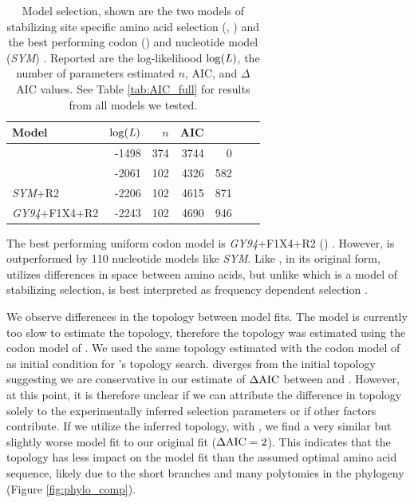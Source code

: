 \documentclass[12pt]{article}
\begin{document}
\begin{table}
  \centering
  \caption{Model selection, shown are the two models of stabilizing site specific amino acid selection (\selac, \phydms) and the best performing codon (\gy) and nucleotide model  (\emph{SYM}) \citep{GoldmanAndYang1994, zharkikh1994}. 
  Reported are the log-likelihood $\log(\text{\emph{L}})$, the number of parameters estimated $n$, AIC, and $\Delta$AIC values.
  See Table \ref{tab:AIC_full} for results from all models we tested.
}  
  \begin{tabular}{lrrrrrr}
    \hline
    Model							& $\log(\text{\emph{L}})$ & $n$ & AIC & \DeltaAIC \\ \hline 
    \selac							& -1498 & 374 & 3744 &  0 \\
    \phydms 						& -2061 & 102 & 4326 & 582 \\
    \emph{SYM}+R2 				& -2206 & 102 & 4615 & 871 \\
    \emph{GY94}+F1X4+R2 		& -2243 & 102 & 4690 & 946 \\ \hline
  \end{tabular}
  \label{tab:AIC_selac}
\end{table}


The best performing uniform codon model is \emph{GY94}+F1X4+R2 (\gy) \citep{GoldmanAndYang1994}. 
However, \gy is outperformed by 110 nucleotide models like \emph{SYM}.
Like \selac, \gy in its original form, utilizes differences in \PC space between amino acids, but unlike \selac which is a model of stabilizing selection, \gy is best interpreted as frequency dependent selection \citep{HughesAndNei1988,Nowak2006,Hughes2007,beaulieu2019}.

We observe differences in the topology between model fits.
The \selac model is currently too slow to estimate the topology, therefore the topology was estimated using the codon model of \citet{KosiolEtAl07}.
We used the same topology estimated with the codon model of \citet{KosiolEtAl07} as initial condition for \phydms's topology search.
\phydms diverges from the initial topology suggesting we are conservative in our estimate of $\Delta\text{AIC}$ between \selac and \phydms.
However, at this point, it is therefore unclear if  we can attribute the difference in topology solely to the experimentally inferred selection parameters or if other factors contribute.
If we utilize the \phydms inferred topology, with \selac, we find a very similar but slightly worse model fit to our original \selac fit ($\Delta\text{AIC} = 2$).
This indicates that the topology has less impact on the model fit than the assumed optimal amino acid sequence, likely due to the short branches and many polytomies in the phylogeny (Figure \ref{fig:phylo_comp}).
\end{document}
